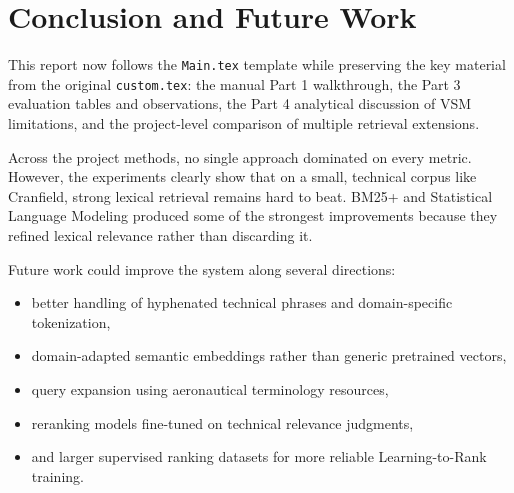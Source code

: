\section{Conclusion and Future Work}\label{sec:conclusion}

This report now follows the \texttt{Main.tex} template while preserving the key material from the original \texttt{custom.tex}: the manual Part 1 walkthrough, the Part 3 evaluation tables and observations, the Part 4 analytical discussion of VSM limitations, and the project-level comparison of multiple retrieval extensions.

Across the project methods, no single approach dominated on every metric. However, the experiments clearly show that on a small, technical corpus like Cranfield, strong lexical retrieval remains hard to beat. BM25+ and Statistical Language Modeling produced some of the strongest improvements because they refined lexical relevance rather than discarding it.

Future work could improve the system along several directions:
\begin{itemize}
    \item better handling of hyphenated technical phrases and domain-specific tokenization,
    \item domain-adapted semantic embeddings rather than generic pretrained vectors,
    \item query expansion using aeronautical terminology resources,
    \item reranking models fine-tuned on technical relevance judgments,
    \item and larger supervised ranking datasets for more reliable Learning-to-Rank training.
\end{itemize}
